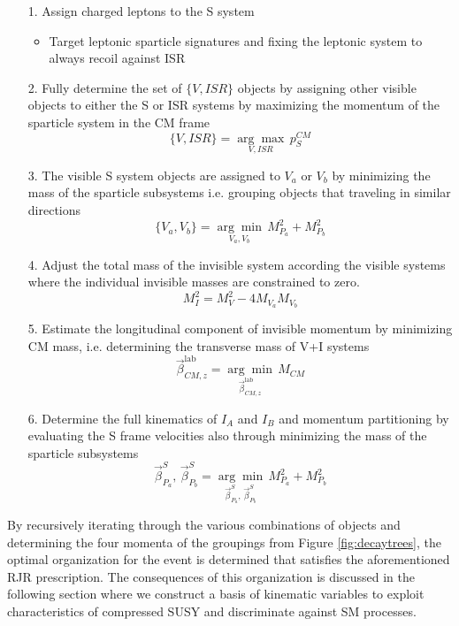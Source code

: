 \begin{itemize}
\item[1.] Assign charged leptons to the S system
\begin{itemize}
	\item Target leptonic sparticle signatures and fixing the leptonic system to always recoil against ISR
\end{itemize}
\item[2.] Fully determine the set of $\{V,ISR\}$ objects by assigning other visible objects to either the S or ISR systems by maximizing the momentum of the sparticle system in the CM frame
\begin{equation}
\{V,ISR\} =  \underset{V,ISR}{\arg\max} \, p_S^{CM}
\end{equation}
\item[3.] The visible S system objects are assigned to $V_a$ or $V_b$ by minimizing the mass of the sparticle subsystems i.e. grouping objects that traveling in similar directions
\begin{equation}
\{V_a,V_b\} = \underset{V_a,V_b}{\arg\min} \, M_{P_a}^2 + M_{P_b}^2
\end{equation}
\item[4.] Adjust the total mass of the invisible system according the visible systems where the individual invisible masses are constrained to zero.
\begin{equation}
M_I^2 = M_V^2 - 4M_{V_a}M_{V_b}
\end{equation}
\item[5.] Estimate the longitudinal component of invisible momentum by minimizing CM mass, i.e. determining the transverse mass of V+I systems
\begin{equation}
 \vec{\beta}_{CM,z}^{\text{lab}} = \underset{\vec{\beta}_{CM,z}^{\text{lab}} } {\arg\min} \, M_{CM}
\end{equation}
\item[6.] Determine the full kinematics of $I_A$ and $I_B$ and momentum partitioning  by evaluating the S frame velocities also through minimizing the mass of the sparticle subsystems
\begin{equation}
\vec{\beta}_{P_a}^S, \, \vec{\beta}_{P_b}^S = \underset{\vec{\beta}_{P_a}^S, \, \vec{\beta}_{P_b}^S}{\arg\min} \, M_{P_a}^2 + M_{P_b}^2
\end{equation}
\end{itemize}

By recursively iterating through the various combinations of objects and determining  the four momenta of the groupings from Figure \ref{fig:decaytrees}, the optimal organization for the event is determined that satisfies the aforementioned RJR prescription. The consequences of this organization is discussed in the following section where we construct a basis of kinematic variables to exploit characteristics of compressed SUSY and discriminate against SM processes.




